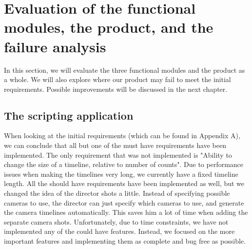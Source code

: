\section{Evaluation of the functional modules, the product, and the failure analysis}

In this section, we will evaluate the three functional modules and the product as a whole. We will also explore where our product may fail to meet the initial requirements. Possible improvements will be discussed in the next chapter.\\

\subsection{The scripting application}
When looking at the initial requirements (which can be found in Appendix A), we can conclude that all but one of the must have requirements have been implemented. The only requirement that was not implemented is "Ability to change the size of a timeline, relative to number of counts". Due to performance issues when making the timelines very long, we currently have a fixed timeline length. All the should have requirements have been implemented as well, but we changed the idea of the director shots a little. Instead of specifying possible cameras to use, the director can just specify which cameras to use, and generate the camera timelines automatically. This saves him a lot of time when adding the separate camera shots. Unfortunately, due to time constraints, we have not implemented any of the could have features. Instead, we focused on the more important features and implementing them as complete and bug free as possible.

